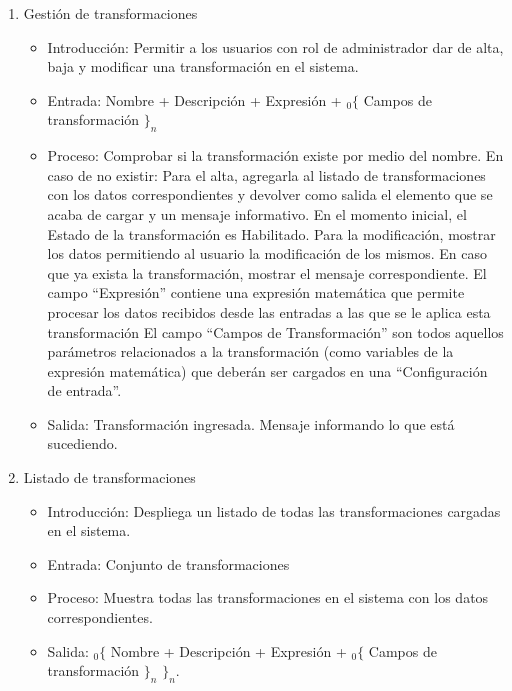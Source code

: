 \begin{enumerate}
			\item Gestión de transformaciones
				\begin{itemize}
					\item Introducción: Permitir a los usuarios con rol de administrador dar de alta, baja y modificar una transformación en el sistema.
					\item Entrada: Nombre + Descripción + Expresión + ${}_{0}\{$ Campos de transformación $\}_n$
					\item Proceso: Comprobar si la transformación existe por medio del nombre. En caso de no existir:
							Para el alta, agregarla al listado de transformaciones con los datos correspondientes y devolver como salida el elemento que se acaba de cargar y un mensaje informativo. En el momento inicial, el Estado de la transformación es Habilitado.
							Para la modificación, mostrar los datos permitiendo al usuario la modificación de los mismos.
							En caso que ya exista la transformación, mostrar el mensaje correspondiente.
							El campo ``Expresión'' contiene una expresión matemática que permite procesar los datos recibidos desde las entradas a las que se le aplica esta transformación
							El campo ``Campos de Transformación'' son todos aquellos parámetros relacionados a la transformación (como variables de la expresión matemática) que deberán ser cargados en una ``Configuración de entrada''.
					\item Salida: Transformación ingresada. Mensaje informando lo que está sucediendo.
				\end{itemize}
				
			\item Listado de transformaciones
				\begin{itemize}
					\item Introducción: Despliega un listado de todas las transformaciones cargadas en el sistema.
					\item Entrada: Conjunto de transformaciones
					\item Proceso: Muestra todas las transformaciones en el sistema con los datos correspondientes.
					\item Salida: ${}_{0}\{$ Nombre + Descripción + Expresión + ${}_{0}\{$ Campos de transformación $\}_n$ $\}_n$.
				\end{itemize}
			

\end{enumerate}
